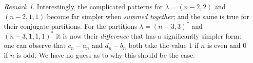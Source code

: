 \documentclass[12pt]{article}
\newcommand{\TransposePartition}[1]{{#1}^{\ast}}
\theoremstyle{plain}
\theoremstyle{definition}
\theoremstyle{remark}
\newtheorem{rmk}[thm]{Remark}
\begin{document}


\begin{rmk}
    Interestingly, the complicated patterns for $\lambda = (n-2,2)$ and $(n-2,1,1)$ become far simpler when \emph{summed together}; and the same is true for their conjugate partitions. For the partitions $\lambda = \TransposePartition{(n-3,3)}$ and $\TransposePartition{(n-3,1,1,1)}$ it is now their \emph{difference} that has a significantly simpler form:
    one can observe that $c_n - a_n$ and $d_n - b_n$ both take the value $1$ if $n$ is even and $0$ if $n$ is odd. %
    We have no guess as to why this should be the case.
\end{rmk}
\end{document}
